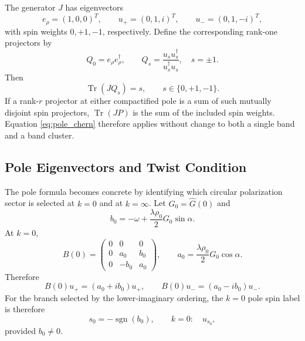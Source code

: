 \documentclass[11pt]{article}
\numberwithin{equation}{section}
\begin{document}
The generator $J$ has eigenvectors
\begin{equation}
  e_\rho=(1,0,0)^T,\qquad
  u_+=(0,1,i)^T,\qquad
  u_-=(0,1,-i)^T,
\end{equation}
with spin weights $0,+1,-1$, respectively.
Define the corresponding rank-one projectors by
\begin{equation}
  Q_0=e_\rho e_\rho^\dagger,
  \qquad
  Q_s=\frac{u_su_s^\dagger}{u_s^\dagger u_s},
  \quad s=\pm1 .
\end{equation}
Then
\begin{equation}
  \operatorname{Tr}(JQ_s)=s,
  \qquad s\in\{0,+1,-1\}.
  \label{eq:spin_projector_weight}
\end{equation}
If a rank-$r$ projector at either compactified pole is a sum of such mutually disjoint spin
projectors, $\operatorname{Tr}(JP)$ is the sum of the included spin
weights. Equation \eqref{eq:pole_chern} therefore applies without
change to both a single band and a band cluster.

\subsection{Pole Eigenvectors and Twist Condition}

The pole formula becomes concrete by identifying which circular
polarization sector is selected at $k=0$ and at $k=\infty$. Let
$G_0=\widehat G(0)$ and
\begin{equation}
  b_0=
  -\omega+\frac{\lambda\rho_0}{2}G_0\sin\alpha .
  \label{eq:b0_pole}
\end{equation}
At $k=0$,
\begin{equation}
  B(0)=
  \begin{pmatrix}
  0&0&0\\
  0&a_0&b_0\\
  0&-b_0&a_0
  \end{pmatrix},
  \qquad
  a_0=\frac{\lambda\rho_0}{2}G_0\cos\alpha .
\end{equation}
Therefore
\begin{equation}
  B(0)u_+=(a_0+ib_0)u_+,\qquad
  B(0)u_-=(a_0-ib_0)u_- .
\end{equation}
For the branch selected by the lower-imaginary ordering, the $k=0$ pole spin
label is therefore
\begin{equation}
  s_0=-\operatorname{sgn}(b_0),
  \qquad
  k=0:\quad u_{s_0},
  \label{eq:zero_pole_sector}
\end{equation}
provided $b_0\ne0$.
\end{document}
